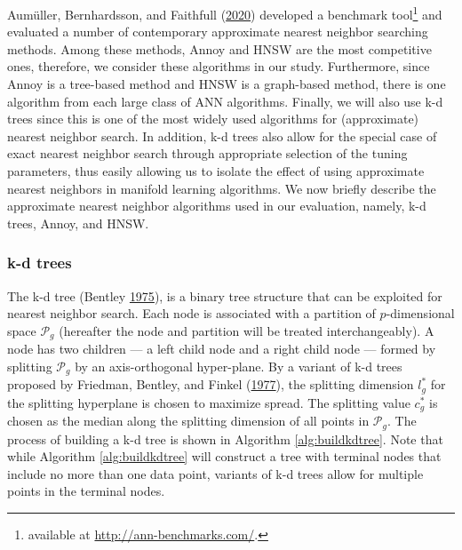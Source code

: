 \documentclass[12pt]{article}
\begin{document}
Aumüller, Bernhardsson, and Faithfull (\protect\hyperlink{ref-Aumuller2020-nk}{2020}) developed a benchmark tool\footnote{available at \url{http://ann-benchmarks.com/}.} and evaluated a number of contemporary approximate nearest neighbor searching methods. Among these methods, Annoy and HNSW are the most competitive ones, therefore, we consider these algorithms in our study. Furthermore, since Annoy is a tree-based method and HNSW is a graph-based method, there is one algorithm from each large class of ANN algorithms. Finally, we will also use k-d trees since this is one of the most widely used algorithms for (approximate) nearest neighbor search. In addition, k-d trees also allow for the special case of exact nearest neighbor search through appropriate selection of the tuning parameters, thus easily allowing us to isolate the effect of using approximate nearest neighbors in manifold learning algorithms. We now briefly describe the approximate nearest neighbor algorithms used in our evaluation, namely, k-d trees, Annoy, and HNSW.

\hypertarget{k-d-trees}{%
\subsubsection*{k-d trees}\label{k-d-trees}}

The k-d tree (Bentley \protect\hyperlink{ref-Bentley1975-zo}{1975}), is a binary tree structure that can be exploited for nearest neighbor search. Each node is associated with a partition of \(p\)-dimensional space \(\mathcal{P}_g\) (hereafter the node and partition will be treated interchangeably). A node has two children --- a left child node and a right child node --- formed by splitting \(\mathcal{P}_g\) by an axis-orthogonal hyper-plane. By a variant of k-d trees proposed by Friedman, Bentley, and Finkel (\protect\hyperlink{ref-Friedman1977-dh}{1977}), the splitting dimension \(l_g^*\) for the splitting hyperplane is chosen to maximize spread. The splitting value \(c_g^*\) is chosen as the median along the splitting dimension of all points in \(\mathcal{P}_g\). The process of building a k-d tree is shown in Algorithm \ref{alg:buildkdtree}. Note that while Algorithm \ref{alg:buildkdtree} will construct a tree with terminal nodes that include no more than one data point, variants of k-d trees allow for multiple points in the terminal nodes.
\end{document}
